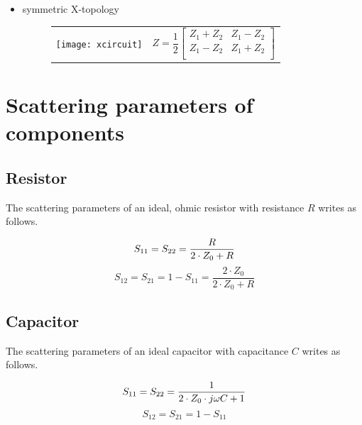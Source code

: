 \documentclass[10pt]{report}
\begin{document}
\begin{itemize}
\item symmetric X-topology

\begin{figure}[ht]
\begin{tabular}{cc}
\begin{minipage}[t]{0.4\linewidth}
\centering
\texttt{[image: xcircuit]}
\end{minipage}
&
\begin{minipage}[t]{0.5\linewidth}
$
Z = \dfrac{1}{2}
\begin{bmatrix}
Z_1 + Z_2 & Z_1 - Z_2\\
Z_1 - Z_2 & Z_1 + Z_2\\
\end{bmatrix}
$
\end{minipage}
\end{tabular}
\end{figure}
\FloatBarrier

\end{itemize}

\section{Scattering parameters of components}

\subsection{Resistor}

The scattering parameters of an ideal, ohmic resistor with resistance
$R$ writes as follows.

\begin{equation}
S_{11} = S_{22} = \frac{R}{2\cdot Z_0+R} \\
\end{equation}
\begin{equation}
S_{12} = S_{21} = 1-S_{11} = \frac{2\cdot Z_0}{2\cdot Z_0+R}
\end{equation}

\subsection{Capacitor}

The scattering parameters of an ideal capacitor with capacitance $C$
writes as follows.

\begin{equation}
S_{11} = S_{22} = \frac{1}{2\cdot Z_0\cdot j\omega C+1} \\
\end{equation}
\begin{equation}
S_{12} = S_{21} = 1-S_{11}
\end{equation}
\end{document}
